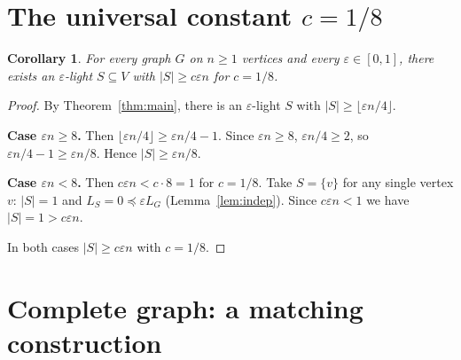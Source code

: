 \documentclass[12pt]{article}
\newtheorem{corollary}[theorem]{Corollary}
\theoremstyle{definition}
\begin{document}
\section{The universal constant $c=1/8$}

\begin{corollary}\label{cor:c18}
For every graph $G$ on $n\ge 1$ vertices and every $\varepsilon\in[0,1]$, there
exists an $\varepsilon$-light $S\subseteq V$ with $|S|\ge c\varepsilon n$ for $c=1/8$.
\end{corollary}
\begin{proof}
By Theorem~\ref{thm:main}, there is an $\varepsilon$-light $S$ with
$|S|\ge\lfloor\varepsilon n/4\rfloor$.

\noindent\textbf{Case $\varepsilon n\ge 8$.}
Then $\lfloor\varepsilon n/4\rfloor\ge\varepsilon n/4-1$.  Since $\varepsilon n\ge 8$,
$\varepsilon n/4\ge 2$, so $\varepsilon n/4-1\ge\varepsilon n/8$.  Hence $|S|\ge\varepsilon n/8$.

\noindent\textbf{Case $\varepsilon n<8$.}
Then $c\varepsilon n < c\cdot 8 = 1$ for $c=1/8$.  Take $S=\{v\}$ for any single
vertex $v$: $|S|=1$ and $L_S=0\preceq\varepsilon L_G$ (Lemma~\ref{lem:indep}).
Since $c\varepsilon n<1$ we have $|S|=1>c\varepsilon n$.

In both cases $|S|\ge c\varepsilon n$ with $c=1/8$.
\end{proof}

\section{Complete graph: a matching construction}
\end{document}
